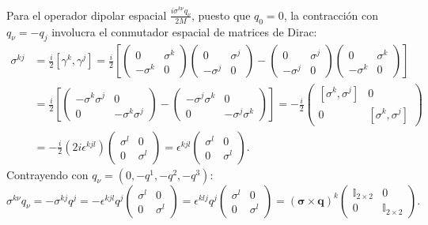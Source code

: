 \documentclass[10pt,a4paper]{article}
\begin{document}
Para el operador dipolar espacial $\frac{i \sigma^{k\nu} q_\nu}{2M}$, puesto que $q_0 = 0$, la contracción con $q_\nu = -q_j$ involucra el conmutador espacial de matrices de Dirac:
\begin{align}
\sigma^{kj} &= \frac{i}{2} [\gamma^k, \gamma^j] = \frac{i}{2} \left[ \begin{pmatrix} 0 & \sigma^k \\ -\sigma^k & 0 \end{pmatrix} \begin{pmatrix} 0 & \sigma^j \\ -\sigma^j & 0 \end{pmatrix} - \begin{pmatrix} 0 & \sigma^j \\ -\sigma^j & 0 \end{pmatrix} \begin{pmatrix} 0 & \sigma^k \\ -\sigma^k & 0 \end{pmatrix} \right] \nonumber \\
&= \frac{i}{2} \left[ \begin{pmatrix} -\sigma^k \sigma^j & 0 \\ 0 & -\sigma^k \sigma^j \end{pmatrix} - \begin{pmatrix} -\sigma^j \sigma^k & 0 \\ 0 & -\sigma^j \sigma^k \end{pmatrix} \right] = -\frac{i}{2} \begin{pmatrix} [\sigma^k, \sigma^j] & 0 \\ 0 & [\sigma^k, \sigma^j] \end{pmatrix} \nonumber \\
&= -\frac{i}{2} (2i \epsilon^{kjl}) \begin{pmatrix} \sigma^l & 0 \\ 0 & \sigma^l \end{pmatrix} = \epsilon^{kjl} \begin{pmatrix} \sigma^l & 0 \\ 0 & \sigma^l \end{pmatrix}.
\end{align}
Contrayendo con $q_\nu = (0, -q^1, -q^2, -q^3)$:
\begin{equation}
\sigma^{k\nu} q_\nu = - \sigma^{kj} q^j = - \epsilon^{kjl} q^j \begin{pmatrix} \sigma^l & 0 \\ 0 & \sigma^l \end{pmatrix} = \epsilon^{klj} q^j \begin{pmatrix} \sigma^l & 0 \\ 0 & \sigma^l \end{pmatrix} = (\boldsymbol{\sigma} \times \mathbf{q})^k \begin{pmatrix} \mathbb{I}_{2\times 2} & 0 \\ 0 & \mathbb{I}_{2\times 2} \end{pmatrix}.
\end{equation}
\end{document}

